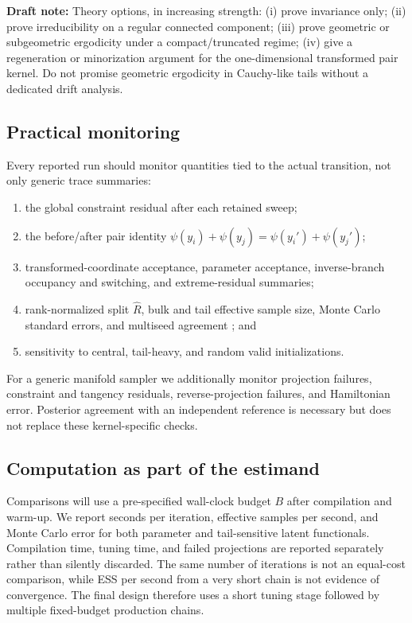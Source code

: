 \documentclass[smallextended,natbib,runningheads]{svjour3}
\newcommand{\draftnote}[1]{\textcolor{blue!70!black}{\textbf{Draft note:} #1}}
\begin{document}
\draftnote{Theory options, in increasing strength: (i) prove invariance only;
(ii) prove irreducibility on a regular connected component; (iii) prove
geometric or subgeometric ergodicity under a compact/truncated regime; (iv)
give a regeneration or minorization argument for the one-dimensional
transformed pair kernel.  Do not promise geometric ergodicity in Cauchy-like
tails without a dedicated drift analysis.}

\subsection{Practical monitoring}

Every reported run should monitor quantities tied to the actual transition,
not only generic trace summaries:
\begin{enumerate}
  \item the global constraint residual after each retained sweep;
  \item the before/after pair identity
  $\psi(y_i)+\psi(y_j)=\psi(y_i')+\psi(y_j')$;
  \item transformed-coordinate acceptance, parameter acceptance, inverse-branch
  occupancy and switching, and extreme-residual summaries;
  \item rank-normalized split $\widehat R$, bulk and tail effective sample size,
  Monte Carlo standard errors, and multiseed agreement
  \citep{vehtari2021}; and
  \item sensitivity to central, tail-heavy, and random valid initializations.
\end{enumerate}
For a generic manifold sampler we additionally monitor projection failures,
constraint and tangency residuals, reverse-projection failures, and Hamiltonian
error.  Posterior agreement with an independent reference is necessary but
does not replace these kernel-specific checks.

\subsection{Computation as part of the estimand}

Comparisons will use a pre-specified wall-clock budget $B$ after compilation
and warm-up.  We report seconds per iteration, effective samples per second,
and Monte Carlo error for both parameter and tail-sensitive latent
functionals.  Compilation time, tuning time, and failed projections are
reported separately rather than silently discarded.  The same number of
iterations is not an equal-cost comparison, while ESS per second from a very
short chain is not evidence of convergence.  The final design therefore uses
a short tuning stage followed by multiple fixed-budget production chains.
\end{document}
